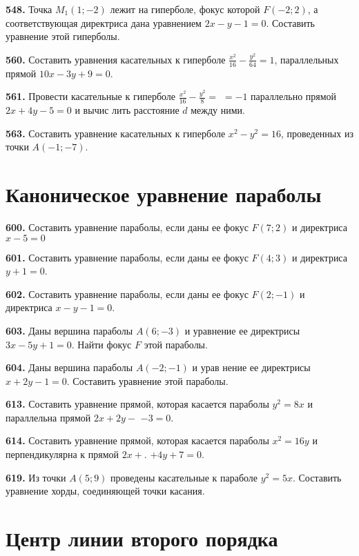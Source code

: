\textbf{548.} Точка $M_1(1 ;-2)$ лежит на гиперболе, фокус которой $F(-2 ; 2)$, а соответствующая директриса дана уравнением $2 x-y-1=0$. Составить уравнение этой гиперболы.

\textbf{560.} Составить уравнения касательных к гиперболе $\frac{x^2}{16}-\frac{y^2}{64}=1$, параллельных прямой $10 x-3 y+9=0$.

\textbf{561.} Провести касательные к гиперболе $\frac{x^2}{16}-\frac{y^2}{8}=$ $=-1$ параллельно прямой $2 x+4 y-5=0$ и вычис лить расстояние $d$ между ними.

\textbf{563.} Составить уравнение касательных к гиперболе $x^2-y^2=16$, проведенных из точки $A(-1 ;-7)$.



\section{Каноническое уравнение параболы}



\textbf{600.} Составить уравнение параболы, если даны ее фокус $F(7 ; 2)$ и директриса $x-5=0$

\textbf{601.} Составить уравнение параболы, если даны ее фокус $F(4 ; 3)$ и директриса $y+1=0$.

\textbf{602.} Составить уравнение параболы, если даны ее фокус $F(2 ;-1)$ и директриса $x-y-1=0$.

\textbf{603.} Даны вершина параболы $A(6 ;-3)$ и уравнение ее директрисы $3 x-5 y+1=0$. Найти фокус $F$ этой параболы.

\textbf{604.} Даны вершина параболы $A(-2 ;-1)$ и урав нение ее директрисы $x+2 y-1=0$. Составить уравнение этой параболы.

\textbf{613.} Составить уравнение прямой, которая касается параболы $y^2=8 x$ и параллельна прямой $2 x+2 y-$ $-3=0$.

\textbf{614.} Составить уравнение прямой, которая касается параболы $x^2=16 y$ и перпендикулярна к прямой $2 x+$. $+4 y+7=0$.

\textbf{619.} Из точки $A(5 ; 9)$ проведены касательные к параболе $y^2=5 x$. Составить уравнение хорды, соединяющей точки касания.



\section{ Центр линии второго порядка }



